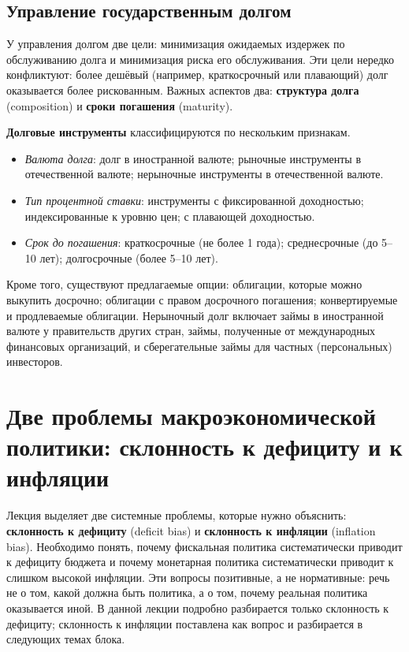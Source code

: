 \documentclass[11pt,a4paper]{article}
\begin{document}
\subsection{Управление государственным долгом}

У управления долгом две цели: минимизация ожидаемых издержек по обслуживанию долга и минимизация риска его обслуживания. Эти цели нередко конфликтуют: более дешёвый (например, краткосрочный или плавающий) долг оказывается более рискованным. Важных аспектов два: \textbf{структура долга} (composition) и \textbf{сроки погашения} (maturity).

\textbf{Долговые инструменты} классифицируются по нескольким признакам.
\begin{itemize}[leftmargin=1.5em]
\item \textit{Валюта долга}: долг в иностранной валюте; рыночные инструменты в отечественной валюте; нерыночные инструменты в отечественной валюте.
\item \textit{Тип процентной ставки}: инструменты с фиксированной доходностью; индексированные к уровню цен; с плавающей доходностью.
\item \textit{Срок до погашения}: краткосрочные (не более 1 года); среднесрочные (до 5--10 лет); долгосрочные (более 5--10 лет).
\end{itemize}
Кроме того, существуют предлагаемые опции: облигации, которые можно выкупить досрочно; облигации с правом досрочного погашения; конвертируемые и продлеваемые облигации. Нерыночный долг включает займы в иностранной валюте у правительств других стран, займы, полученные от международных финансовых организаций, и сберегательные займы для частных (персональных) инвесторов.

\section{Две проблемы макроэкономической политики: склонность к дефициту и к инфляции}

Лекция выделяет две системные проблемы, которые нужно объяснить: \textbf{склонность к дефициту} (deficit bias) и \textbf{склонность к инфляции} (inflation bias). Необходимо понять, почему фискальная политика систематически приводит к дефициту бюджета и почему монетарная политика систематически приводит к слишком высокой инфляции. Эти вопросы позитивные, а не нормативные: речь не о том, какой должна быть политика, а о том, почему реальная политика оказывается иной. В данной лекции подробно разбирается только склонность к дефициту; склонность к инфляции поставлена как вопрос и разбирается в следующих темах блока.
\end{document}
